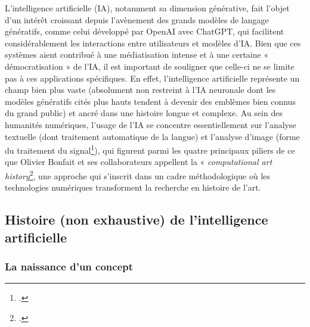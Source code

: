 L’intelligence artificielle (IA), notamment sa dimension générative, fait l’objet d’un intérêt croissant depuis l’avènement des grands modèles de langage génératifs, comme celui développé par OpenAI avec ChatGPT, qui facilitent considérablement les interactions entre utilisateurs et modèles d’IA. Bien que ces systèmes aient contribué à une médiatisation intense et à une certaine « démocratisation » de l’IA, il est important de souligner que celle-ci ne se limite pas à ces applications spécifiques. En effet, l’intelligence artificielle représente un champ bien plus vaste (absolument non restreint à l’IA neuronale dont les modèles génératifs cités plus hauts tendent à devenir des emblèmes bien connus du grand public) et ancré dans une histoire longue et complexe. 
Au sein des humanités numériques, l’usage de l’IA se concentre essentiellement sur l’analyse textuelle (dont traitement automatique de la langue) et l’analyse d’image (forme du traitement du signal\footcite[p.98]{sauret_intelligence_2022}), qui figurent parmi les quatre principaux piliers de ce que Olivier Bonfait et ses collaborateurs appellent la « \textit{computational art history}\footcite[p.6]{bonfait_humanites_2021}, une approche qui s’inscrit dans un cadre méthodologique où les technologies numériques transforment la recherche en histoire de l’art. 

\subsection{Histoire (non exhaustive) de l’intelligence artificielle}
\subsubsection{La naissance d’un concept}


